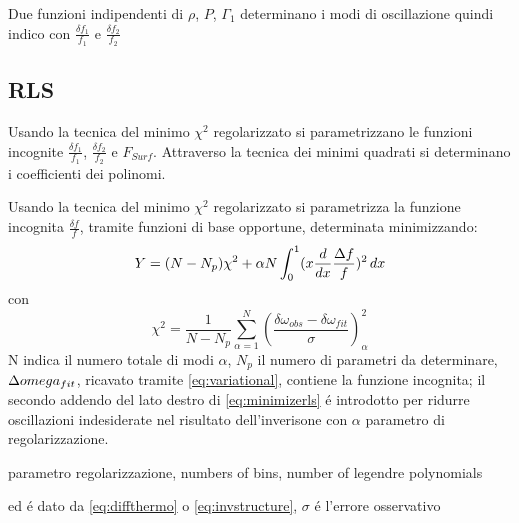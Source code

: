 \documentclass[../main.tex]{subfiles}
\begin{document}
\begin{workout}

Due funzioni indipendenti di $\rho$, $P$, $\Gamma_1$ determinano i modi di oscillazione quindi indico con $\frac{\delta f_1}{f_1}$ e $\frac{\delta f_2}{f_2}$

\end{workout}

\subsection{RLS}

\begin{workout}

Usando la tecnica del minimo $\chi^2$ regolarizzato si parametrizzano le funzioni incognite $\frac{\delta f_1}{f_1}$, $\frac{\delta f_2}{f_2}$ e $F_{Surf}$. Attraverso la tecnica dei minimi quadrati si determinano i coefficienti dei polinomi.

\end{workout}

Usando la tecnica del minimo $\chi^2$ regolarizzato si parametrizza la funzione incognita $\frac{\delta f}{f}$, tramite funzioni di base opportune, determinata minimizzando:
\begin{equation}
Y=(N-N_p)\chi^2+\alpha N\int_0^1(x\frac{d}{d x}\frac{\Delta f}{f})^2\,dx\label{eq:minimizerls}
\end{equation}
con
\begin{equation}
\chi^2=\frac{1}{N-N_p}\sum_{\alpha=1}^N(\frac{\delta\omega_{obs}-\delta\omega_{fit}}{\sigma})^2_{\alpha}
\end{equation}
N indica il numero totale di modi $\alpha$, $N_p$ il numero di parametri da determinare, $\Delta\\omega_{fit}$, ricavato tramite \eqref{eq:variational}, contiene la funzione incognita; il secondo addendo del lato destro di \eqref{eq:minimizerls} \'e introdotto per ridurre oscillazioni indesiderate nel risultato dell'inverisone con $\alpha$ parametro di regolarizzazione.

\begin{workout}
parametro regolarizzazione, numbers of bins, number of legendre polynomials
\end{workout}

\begin{workout}
ed \'e dato da \eqref{eq:diffthermo} o \eqref{eq:invstructure}, $\sigma$ \'e l'errore osservativo
\end{workout}
\end{document}
